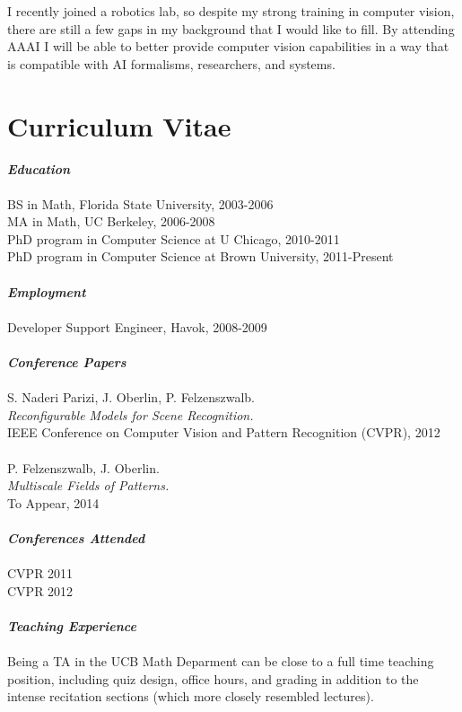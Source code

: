 \documentclass[12pt]{article}
\numberwithin{equation}{section}
\numberwithin{table}{section}
\numberwithin{figure}{section}
\begin{document}
I recently joined a robotics lab, so despite my strong training in computer vision,
there are still a few gaps in my background that I would like to fill.
By attending AAAI I will be able to better provide computer vision capabilities in a
way that is compatible with AI formalisms, researchers, and systems.

\newpage

\section{Curriculum Vitae}
\textbf{\emph{Education}}\\
 \\
BS in Math, Florida State University, 2003-2006 \\
MA in Math, UC Berkeley, 2006-2008 \\
PhD program in Computer Science at U Chicago, 2010-2011 \\
PhD program in Computer Science at Brown University, 2011-Present \\
 \\ 
\textbf{\emph{Employment}}\\
\\
Developer Support Engineer, Havok, 2008-2009 \\
 \\
\textbf{\emph{Conference Papers}}\\
 \\
S. Naderi Parizi, J. Oberlin, P. Felzenszwalb.\\
\emph{Reconfigurable Models for Scene Recognition.}\\
IEEE Conference on Computer Vision and Pattern Recognition (CVPR), 2012\\
 \\
P. Felzenszwalb, J. Oberlin.  \\
\emph{Multiscale Fields of Patterns.}\\
To Appear, 2014 \\
 \\
\textbf{\emph{Conferences Attended}}\\
 \\
CVPR 2011\\
CVPR 2012 \\
 \\
\textbf{\emph{Teaching Experience}}\\
 \\
Being a TA in the UCB Math Deparment can be close to a full time teaching position, including
quiz design, office hours, and grading in addition to the intense recitation sections (which more closely resembled lectures). \\
\end{document}
